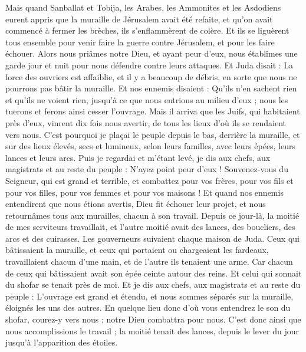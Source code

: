 \begin{multicols}{2}
Mais quand Sanballat et Tobija, les Arabes, les Ammonites et les Asdodiens eurent appris que la muraille de Jérusalem avait été refaite, et qu'on avait commencé à fermer les brèches, ils s'enflammèrent de colère.
Et ils se liguèrent tous ensemble pour venir faire la guerre contre Jérusalem, et pour les faire échouer.
Alors nous priâmes notre Dieu, et ayant peur d'eux, nous établîmes une garde jour et nuit pour nous défendre contre leurs attaques.
Et Juda disait : La force des ouvriers est affaiblie, et il y a beaucoup de débris, en sorte que nous ne pourrons pas bâtir la muraille.
Et nos ennemis disaient : Qu'ils n'en sachent rien et qu'ils ne voient rien, jusqu'à ce que nous entrions au milieu d'eux ; nous les tuerons et ferons ainsi cesser l'ouvrage.
Mais il arriva que les Juifs, qui habitaient près d'eux, vinrent dix fois nous avertir, de tous les lieux d'où ils se rendaient vers nous.
C'est pourquoi je plaçai le peuple depuis le bas, derrière la muraille, et sur des lieux élevés, secs et lumineux, selon leurs familles, avec leurs épées, leurs lances et leurs arcs.
Puis je regardai et m'étant levé, je dis aux chefs, aux magistrats et au reste du peuple : N'ayez point peur d'eux ! Souvenez-vous du Seigneur, qui est grand et terrible, et combattez pour vos frères, pour vos fils et pour vos filles, pour vos femmes et pour vos maisons !
Et quand nos ennemis entendirent que nous étions avertis, Dieu fit échouer leur projet, et nous retournâmes tous aux murailles, chacun à son travail.
Depuis ce jour-là, la moitié de mes serviteurs travaillait, et l'autre moitié avait des lances, des boucliers, des arcs et des cuirasses. Les gouverneurs suivaient chaque maison de Juda.
Ceux qui bâtissaient la muraille, et ceux qui portaient ou chargeaient les fardeaux, travaillaient chacun d'une main, et de l'autre ils tenaient une arme.
Car chacun de ceux qui bâtissaient avait son épée ceinte autour des reins. Et celui qui sonnait du shofar se tenait près de moi.
Et je dis aux chefs, aux magistrats et au reste du peuple : L'ouvrage est grand et étendu, et nous sommes séparés sur la muraille, éloignés les uns des autres.
En quelque lieu donc d'où vous entendrez le son du shofar, courez-y vers nous ; notre Dieu combattra pour nous.
C'est donc ainsi que nous accomplissions le travail ; la moitié tenait des lances, depuis le lever du jour jusqu'à l'apparition des étoiles.

\end{multicols}
